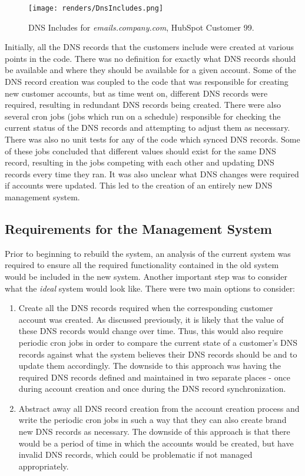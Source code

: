 \begin{figure}[H]
      \centering
      \texttt{[image: renders/DnsIncludes.png]}
      \caption{DNS Includes for \textit{emails.company.com}, HubSpot Customer 99.}
      \label{fig:dnsIncludes}
\end{figure}

Initially, all the DNS records that the customers include were created at various points in the code. There was no definition for exactly what DNS records should be available and where they should be available for a given account. Some of the DNS record creation was coupled to the code that was responsible for creating new customer accounts, but as time went on, different DNS records were required, resulting in redundant DNS records being created. There were also several cron jobs (jobs which run on a schedule) responsible for checking the current status of the DNS records and attempting to adjust them as necessary. There was also no unit tests for any of the code which synced DNS records. Some of these jobs concluded that different values should exist for the same DNS record, resulting in the jobs competing with each other and updating DNS records every time they ran. It was also unclear what DNS changes were required if accounts were updated. This led to the creation of an entirely new DNS management system.


\subsection{Requirements for the Management System}
Prior to beginning to rebuild the system, an analysis of the current system was required to ensure all the required functionality contained in the old system would be included in the new system. Another important step was to consider what the \textit{ideal} system would look like. There were two main options to consider:

\begin{enumerate}
    \item{Create all the DNS records required when the corresponding customer account was created. As discussed previously, it is likely that the value of these DNS records would change over time. Thus, this would also require periodic cron jobs in order to compare the current state of a customer's DNS records against what the system believes their DNS records should be and to update them accordingly. The downside to this approach was having the required DNS records defined and maintained in two separate places - once during account creation and once during the DNS record synchronization.}
    \item{Abstract away all DNS record creation from the account creation process and write the periodic cron jobs in such a way that they can also create brand new DNS records as necessary. The downside of this approach is that there would be a period of time in which the accounts would be created, but have invalid DNS records, which could be problematic if not managed appropriately.}  
\end{enumerate}

